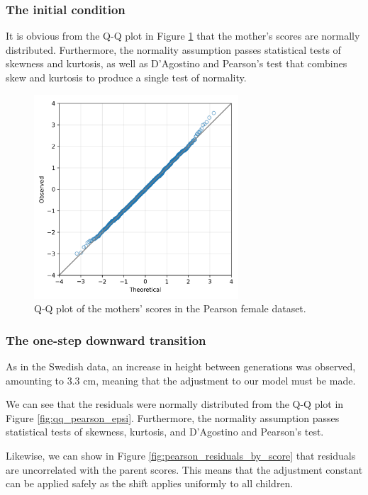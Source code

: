 \documentclass[a4paper,11pt]{article} %
\begin{document}
\subsubsection*{The initial condition}

It is obvious from the Q-Q plot in Figure \ref{fig:qq_pearson_x} that the mother's scores are normally distributed. Furthermore, the normality assumption passes statistical tests of skewness and kurtosis, as well as D’Agostino and Pearson's test that combines skew and kurtosis to produce a single test of normality.

\begin{figure}[h]
\includegraphics[width=3in]{figures/qq_pearson_x.png}
\centering
\caption{Q-Q plot of the mothers' scores in the Pearson female dataset.}
\label{fig:qq_pearson_x}
\end{figure}


\subsubsection*{The one-step downward transition}

As in the Swedish data, an increase in height between generations was observed, amounting to 3.3 cm, meaning that the adjustment to our model must be made. 

We can see that the residuals were normally distributed from the Q-Q plot in Figure \ref{fig:qq_pearson_epsi}. Furthermore, the normality assumption passes statistical tests of skewness, kurtosis, and D’Agostino and Pearson's test.

Likewise, we can show in Figure \ref{fig:pearson_residuals_by_score} that residuals are uncorrelated with the parent scores. This means that the adjustment constant can be applied safely as the shift applies uniformly to all children. 
\end{document}
